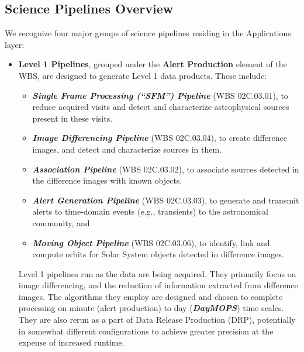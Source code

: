 \documentclass[12pt]{article}
\newcommand{\wbsSFM}{WBS 02C.03.01}
\newcommand{\wbsAssocP}{WBS 02C.03.02}
\newcommand{\wbsAP}{WBS 02C.03.03}
\newcommand{\wbsDiffim}{WBS 02C.03.04}
\newcommand{\wbsMOPS}{WBS 02C.03.06}
\begin{document}
\subsection{Science Pipelines Overview}

We recognize four major groups of science pipelines residing in the Applications layer:
\begin{itemize}
    \item {\bf Level 1 Pipelines}, grouped under the {\bf Alert Production} element of the WBS, are designed to generate Level 1 data products. These include:
    \begin{itemize}
    \item {\bf \emph{Single Frame Processing (``SFM'') Pipeline}} (\wbsSFM), to reduce acquired visits and detect and characterize astrophysical sources present in these visits.
    \item {\bf \emph{Image Differencing Pipeline}} (\wbsDiffim), to create difference images, and detect and characterize sources in them.
    \item {\bf \emph{Association Pipeline}} (\wbsAssocP), to associate sources detected in the difference images with known objects.
    \item {\bf \emph{Alert Generation Pipeline}} (\wbsAP), to generate and transmit alerts to time-domain events (e.g., transients) to the astronomical community, and
    \item {\bf \emph{Moving Object Pipeline}} (\wbsMOPS), to identify, link and compute orbits for Solar System objects detected in difference images.
    \end{itemize}
Level 1 pipelines run as the data are being acquired. They primarily focus on image differencing, and the reduction of information extracted from difference images. The algorithms they employ are designed and chosen to complete processing on minute (alert production) to day (\textbf{\emph{DayMOPS}}) time scales. They are also rerun as a part of Data Release Production (DRP), potentially in somewhat different configurations to achieve greater precision at the expense of increased runtime.
    

\end{itemize}
\end{document}
